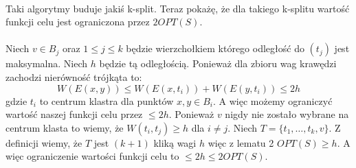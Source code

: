 \\
Taki algorytmy buduje jakiś k-split.
Teraz pokażę, że dla takiego k-splitu wartość funkcji celu jest ograniczona przez $2OPT(S)$.
\\~\\
Niech $v \in B_{j}$ oraz $1 \leq j \leq k$ będzie wierzchołkiem którego odległość do $(t_{j})$ jest maksymalna.
Niech $h$ będzie tą odległością.
Ponieważ dla zbioru wag krawędzi zachodzi nierówność trójkąta to:
\begin{equation}
    W(E(x, y)) \leq W(E(x, t_{i})) + W(E(y, t_{i})) \leq 2h
\end{equation}
gdzie $t_{i}$ to centrum klastra dla punktów $x, y \in B_{i}$.
A więc możemy ograniczyć wartość naszej funkcji celu przez $\leq 2h$.
Ponieważ $v$ nigdy nie zostało wybrane na centrum klasta to wiemy, że $W(t_{i}, t_{j}) \geq h$ dla $i \neq j$.
Niech $T = \{ t_{1}, \dots, t_{k}, v \}$.
Z definicji wiemy, że $T$ jest $(k+1)$ kliką wagi $h$ więc z lematu 2 $OPT(S) \geq h$.
A więc ograniczenie wartości funkcji celu to $\leq 2h \leq 2OPT(S)$.
